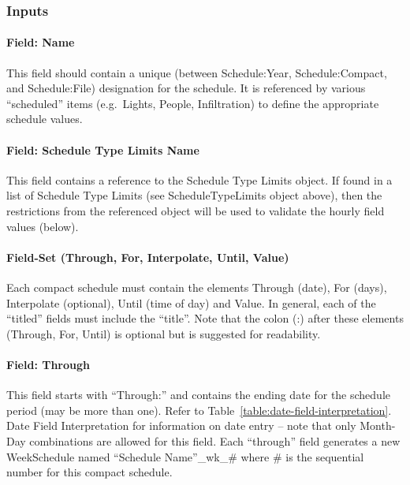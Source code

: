 \subsubsection{Inputs}\label{inputs-7-023}

\paragraph{Field: Name}\label{field-name-6-019}

This field should contain a unique (between Schedule:Year, Schedule:Compact, and Schedule:File) designation for the schedule. It is referenced by various ``scheduled'' items (e.g.~Lights, People, Infiltration) to define the appropriate schedule values.

\paragraph{Field: Schedule Type Limits Name}\label{field-schedule-type-limits-name-4}

This field contains a reference to the Schedule Type Limits object. If found in a list of Schedule Type Limits (see ScheduleTypeLimits object above), then the restrictions from the referenced object will be used to validate the hourly field values (below).

\paragraph{Field-Set (Through, For, Interpolate, Until, Value)}\label{field-set-through-for-interpolate-until-value}

Each compact schedule must contain the elements Through (date), For (days), Interpolate (optional), Until (time of day) and Value. In general, each of the ``titled'' fields must include the ``title''. Note that the colon (:) after these elements (Through, For, Until) is optional but is suggested for readability.

\paragraph{Field: Through}\label{field-through}

This field starts with ``Through:'' and contains the ending date for the schedule period (may be more than one). Refer to Table~\ref{table:date-field-interpretation}. Date Field Interpretation for information on date entry -- note that only Month-Day combinations are allowed for this field. Each ``through'' field generates a new WeekSchedule named ``Schedule Name''\_wk\_\# where \# is the sequential number for this compact schedule.


